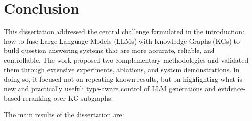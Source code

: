 \chapter*{Conclusion}
\label{chap:conclusion}

This dissertation addressed the central challenge formulated in the introduction: how to fuse Large Language Models (LLMs) with Knowledge Graphs (KGs) to build question answering systems that are more accurate, reliable, and controllable. The work proposed two complementary methodologies and validated them through extensive experiments, ablations, and system demonstrations. In doing so, it focused not on repeating known results, but on highlighting what is new and practically useful: type-aware control of LLM generations and evidence-based reranking over KG subgraphs.

The main results of the dissertation are:

